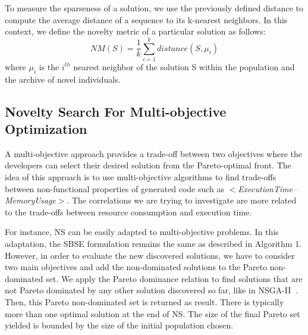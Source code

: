 To measure the sparseness of a solution, we use the previously defined distance to compute the average distance of a sequence to its k-nearest neighbors. In this context, we define the novelty metric of a particular solution as follows:
\begin{equation}
NM(S) = \frac{1}{k} \sum_{i=1}^{k} distance(S,\mu _{i})
\end{equation}
where $\mu _{i}$ is the $i^{th}$ nearest neighbor of the solution S within the population and the archive of novel individuals. 

\subsection{Novelty Search For Multi-objective Optimization}
A multi-objective approach provides a trade-off between two objectives where the developers can select their desired solution from the Pareto-optimal front. The idea of this approach is to use multi-objective algorithms to find trade-offs between non-functional properties of generated code such as \textit{$<$ExecutionTime--MemoryUsage$>$}. The correlations we are trying to investigate are more related to the trade-offs between resource consumption and execution time.
  
For instance, NS can be easily adapted to multi-objective problems. In this adaptation, the SBSE formulation remains the same as described in Algorithm 1. However, in order to evaluate the new discovered solutions, we have to consider two main objectives and add the non-dominated solutions to the Pareto non-dominated set. We apply the Pareto dominance relation to find solutions that are not Pareto dominated by any other solution discovered so far, like in NSGA-II~\cite{lokuciejewski2010multi, deb2002fast}. Then, this Pareto non-dominated set is returned as result.
There is typically more than one optimal solution at the end of NS. The size of the final Pareto set yielded is bounded by the size of the initial population chosen.
